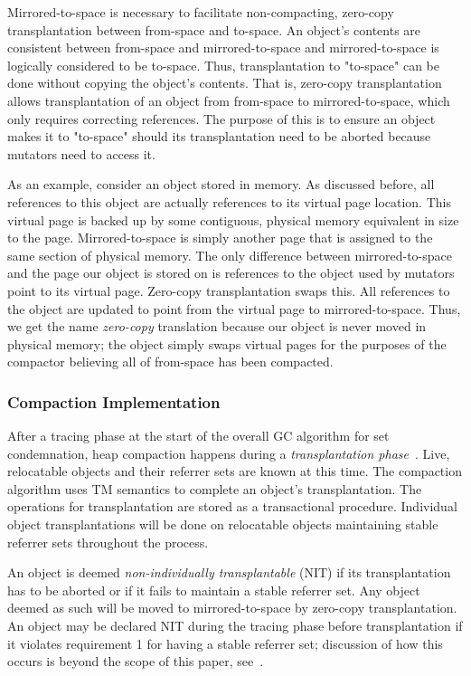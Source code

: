 \documentclass{sig-alternate}
\begin{document}
Mirrored-to-space is necessary to facilitate non-compacting, zero-copy transplantation 
between from-space and to-space. An object's contents are 
consistent between from-space and mirrored-to-space and mirrored-to-space
is logically considered to be to-space. Thus, transplantation to "to-space"
can be done without copying the object's contents. That is, zero-copy transplantation
allows transplantation of an object from from-space to mirrored-to-space, which only
requires correcting references. The purpose of this is to ensure
an object makes it to "to-space" should its transplantation need 
to be aborted because mutators need to access it.

As an example, consider an object stored in memory. As discussed before, all references
to this object are actually references to its virtual page location. This virtual page
is backed up by some contiguous, physical memory equivalent in size to the page. 
Mirrored-to-space is simply another page that is assigned to the same section of physical memory. 
The only difference between mirrored-to-space and the page our object is stored on
is references to the object used by mutators point to its virtual page.
Zero-copy transplantation swaps this. All references to the object are
updated to point from the virtual page to mirrored-to-space. 
Thus, we get the name \emph{zero-copy} translation
because our object is never moved in physical memory; the object simply
swaps virtual pages for the purposes of the compactor believing all of from-space
has been compacted.


\subsubsection{Compaction Implementation}
\label{sec:collieAlgorithmImplementation}

After a tracing phase at the start of the overall GC algorithm for set condemnation, heap compaction
happens during a \emph{transplantation phase}~\cite{Iyengar:Collie}.
Live, relocatable objects and their referrer sets are known at this time. The compaction 
algorithm uses TM semantics to complete an object's
transplantation. The operations for transplantation are stored as a
transactional procedure. Individual object transplantations will be done on relocatable objects 
maintaining stable referrer sets throughout the process.

An object is deemed \emph{non-individually transplantable} (NIT) if its transplantation
has to be aborted or if it fails to maintain a stable referrer set. 
Any object deemed as such will be moved to mirrored-to-space by zero-copy 
transplantation. An object may be declared NIT during the tracing phase before transplantation
if it violates requirement 1 for having a stable referrer set; discussion
of how this occurs is beyond the scope of this paper, see~\cite{Iyengar:Collie}.
\end{document}
